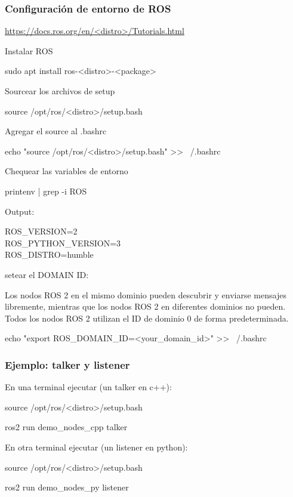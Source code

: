\begin{frame}
	\frametitle{Configuración de entorno de ROS}
    
    \href{https://docs.ros.org/en/<distro>/Tutorials.html}{https://docs.ros.org/en/<distro>/Tutorials.html}
    
    Instalar ROS
    
    sudo apt install ros-<distro>-<package>
    
    Sourcear los archivos de setup
    
    source /opt/ros/<distro>/setup.bash
    
    Agregar el source al .bashrc
    
    echo "source /opt/ros/<distro>/setup.bash" >> ~/.bashrc
    
    Chequear las variables de entorno
    
    printenv | grep -i ROS
    
    Output:
    
    ROS\_VERSION=2\\
    ROS\_PYTHON\_VERSION=3\\
    ROS\_DISTRO=humble
    
    

    setear el DOMAIN ID:
    
    Los nodos ROS 2 en el mismo dominio pueden descubrir y enviarse mensajes libremente, mientras que los nodos ROS 2 en diferentes dominios no pueden. Todos los nodos ROS 2 utilizan el ID de dominio 0 de forma predeterminada.
    
    echo "export ROS\_DOMAIN\_ID=<your\_domain\_id>" >> ~/.bashrc
	
	
\end{frame}

\begin{frame}
	\frametitle{Ejemplo: talker y listener}
	
	En una terminal ejecutar (un talker en c++):
	
	source /opt/ros/<distro>/setup.bash
	
	ros2 run demo\_nodes\_cpp talker
	
	En otra terminal ejecutar (un listener en python):
	
	source /opt/ros/<distro>/setup.bash
	
	ros2 run demo\_nodes\_py listener
	
\end{frame}

